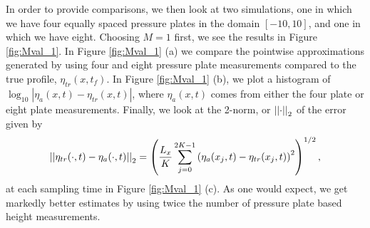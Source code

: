 In order to provide comparisons, we then look at two simulations, one in which we have four equally spaced pressure plates in the domain $[-10,10]$, and one in which we have eight.  Choosing $M=1$ first, we see the results in Figure \ref{fig:Mval_1}.  In Figure \ref{fig:Mval_1} (a) we compare the pointwise approximations generated by using four and eight pressure plate measurements compared to the true profile, $\eta_{tr}(x,t_{f})$.  In Figure \ref{fig:Mval_1} (b), we plot a histogram of $\log_{10}|\eta_{a}(x,t) - \eta_{tr}(x,t)|$, where $\eta_{a}(x,t)$ comes from either the four plate or eight plate measurements.  Finally, we look at the 2-norm, or $\left|\left| \cdot\right|\right|_{2}$ of the error given by  
\[
\left|\left| \eta_{tr}(\cdot,t) - \eta_{a}(\cdot,t)\right|\right|_{2}=\left( \frac{L_{x}}{K}\sum_{j=0}^{2K-1}\left(\eta_{a}(x_{j},t)-\eta_{tr}(x_{j},t) \right)^{2}\right)^{1/2}, 
\]
at each sampling time in Figure \ref{fig:Mval_1} (c).  As one would expect, we get markedly better estimates by using twice the number of pressure plate based height measurements.  
